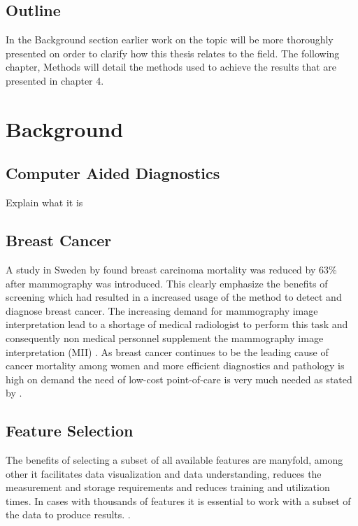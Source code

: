 \documentclass{kththesis}
\begin{document}
\section{Outline} %

In the Background section earlier work on the topic will be more thoroughly presented on order to clarify how this thesis relates to the field. The following chapter, Methods will detail the methods used to achieve the results that are presented in chapter 4.

\chapter{Background}

\section{Computer Aided Diagnostics}

Explain what it is

\section{Breast Cancer} %

A study in Sweden by \textcite{tabar2001} found breast carcinoma mortality was reduced by 63\% after mammography was introduced. This clearly emphasize the benefits of screening which had resulted in a increased usage of the method to detect and diagnose breast cancer. The increasing demand for mammography image interpretation lead to a shortage of medical radiologist to perform this task and consequently non medical personnel supplement the mammography image interpretation (MII) \parencite{culpan2016}. As breast cancer continues to be the leading cause of cancer mortality among women and more efficient diagnostics and pathology is high on demand the need of low-cost point-of-care is very much needed as stated by \textcite{martei2018}.

\section{Feature Selection}

The benefits of selecting a subset of all available features are manyfold, among other it facilitates data visualization and data understanding, reduces the measurement and storage requirements and reduces training and utilization times. In cases with thousands of features it is essential to work with a subset of the data to produce results. \parencite{guyon2003}.
\end{document}
